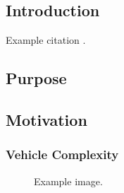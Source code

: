 \documentclass[12pt]{article} %
\begin{document}

\tableofcontents %

\newpage %

\begin{flushleft}
\section{Introduction} %

Example citation \cite{Figueredo:2009dg}.


\subsection{Purpose} %

\lipsum[1] %


\subsection{Motivation} %

\lipsum[2] %


\subsubsection{Vehicle Complexity} %

\lipsum[3] %

\begin{figure}[H] %
\caption{Example image.}
\label{fig:speciation}
\end{figure}


\end{flushleft}
\end{document}
